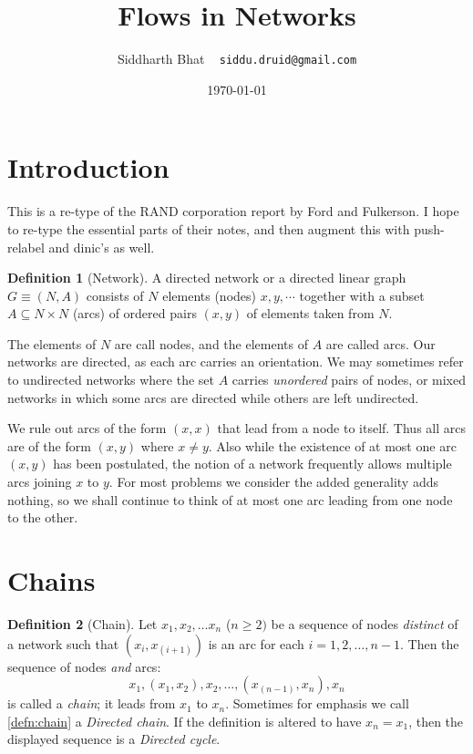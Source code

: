 \documentclass[titlepage]{article}
\title{Flows in Networks}
\author{Siddharth Bhat ~ \texttt{siddu.druid@gmail.com}}
\date{\today}
\theoremstyle{plain}
\theoremstyle{definition}
\newtheorem{definition}{Definition}[theorem]
\theoremstyle{remark}
\begin{document}
\maketitle

\section{Introduction}
This is a re-type of the RAND corporation report by Ford and Fulkerson. I hope
to re-type the essential parts of their notes, and then augment this with
push-relabel and dinic's as well.

\begin{definition}[Network]
     A directed network or a directed linear graph $G \equiv (N, A)$ consists
     of $N$ elements (nodes) $x, y, \cdots$ together with a subset $A \subseteq N \times N$ (arcs)
     of ordered pairs $(x, y)$ of elements taken from $N$.
\end{definition}

The elements of $N$ are call nodes, and the elements of $A$ are called arcs.
Our networks are directed, as each arc carries an orientation. We may sometimes
refer to undirected networks where the set $A$ carries \emph{unordered} pairs
of nodes, or mixed networks in which some arcs are directed while others are
left undirected.

We rule out arcs of the form $(x, x)$ that lead from a node to itself. Thus
all arcs are of the form $(x, y)$ where $x \neq y$. Also while the existence
of at most one arc $(x, y)$ has been postulated, the notion of a network
frequently allows multiple arcs joining $x$ to $y$. For most problems we consider
the added generality adds nothing, so we shall continue to think of at most
one arc leading from one node to the other.


\section{Chains}

\begin{definition}[Chain]
Let $x_1, x_2, \dots x_n$ ($n \geq 2)$ be a sequence of nodes \emph{distinct} of a network
such that $(x_i, x_{(i+1)})$ is an arc for each $i = 1, 2, \dots, n-1$. Then
the sequence of nodes \emph{and} arcs:
\begin{equation}
    \tag{Definition of Chain}
    x_1, (x_1, x_2), x_2, \dots, (x_{(n-1)}, x_n), x_n
    \label{defn:chain}
\end{equation}
is called a \emph{chain}; it leads from $x_1$ to $x_n$. Sometimes for emphasis
we call \eqref{defn:chain} a \emph{Directed chain}. If the definition is altered
to have $x_n = x_1$, then the displayed sequence is a \emph{Directed cycle}.
\end{definition}
\end{document}

